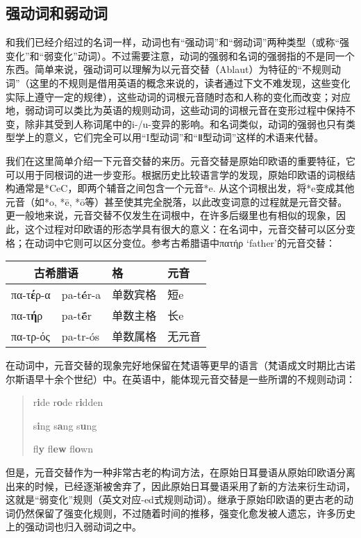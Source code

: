 \subsection{强动词和弱动词}
和我们已经介绍过的名词一样，动词也有“强动词”和“弱动词”两种类型（或称“强变化”和“弱变化”动词）。不过需要注意，动词的强弱和名词的强弱指的不是同一个东西。简单来说，强动词可以理解为以元音交替（Ablaut）为特征的“不规则动词”（这里的不规则是借用英语的概念来说的，读者通过下文不难发现，这些变化实际上遵守一定的规律），这些动词的词根元音随时态和人称的变化而改变；对应地，弱动词可以类比为英语的规则动词，这些动词的词根元音在变形过程中保持不变，除非其受到人称词尾中的i-/u-变异的影响。和名词类似，动词的强弱也只有类型学上的意义，它们完全可以用“I型动词”和“Ⅱ型动词”这样的术语来代替。

我们在这里简单介绍一下元音交替的来历。元音交替是原始印欧语的重要特征，它可以用于同根词的进一步变形。根据历史比较语言学的发现，原始印欧语的词根结构通常是*CeC，即两个辅音之间包含一个元音*e. 从这个词根出发，将*e变成其他元音（如*o, *ē, *ō等）甚至使其完全脱落，以此改变词意的过程就是元音交替。更一般地来说，元音交替不仅发生在词根中，在许多后缀里也有相似的现象，因此，这个过程对印欧语的形态学具有很大的意义：在名词中，元音交替可以区分变格；在动词中它则可以区分变位。参考古希腊语中πατήρ `father'的元音交替：

\begin{longtable}{llll}
    \toprule
    \multicolumn{2}{c}{古希腊语} & 格                & 元音              \\
    \midrule
    \endhead
    \bottomrule
    \endfoot
    πα-τ\textbf{έ}ρ-α            & pa-t\textbf{é}r-a & 单数宾格 & 短e    \\
    πα-τ\textbf{ή}ρ              & pa-t\textbf{ḗ}r   & 单数主格 & 长e    \\
    πα-τρ-ός                     & pa-tr-ós          & 单数属格 & 无元音 \\
\end{longtable}

在动词中，元音交替的现象完好地保留在梵语等更早的语言（梵语成文时期比古诺尔斯语早十余个世纪）中。在英语中，能体现元音交替是一些所谓的不规则动词：

\begin{quote}
    r\textbf{i}de r\textbf{o}de r\textbf{i}dden

    s\textbf{i}ng s\textbf{a}ng s\textbf{u}ng

    fl\textbf{y} fl\textbf{ew} fl\textbf{o}wn
\end{quote}

但是，元音交替作为一种非常古老的构词方法，在原始日耳曼语从原始印欧语分离出来的时候，已经逐渐被舍弃了，因此原始日耳曼语采用了新的方法来衍生动词，这就是“弱变化”规则（英文对应-ed式规则动词）。继承于原始印欧语的更古老的动词仍然保留了强变化规则，不过随着时间的推移，强变化愈发被人遗忘，许多历史上的强动词也归入弱动词之中。


